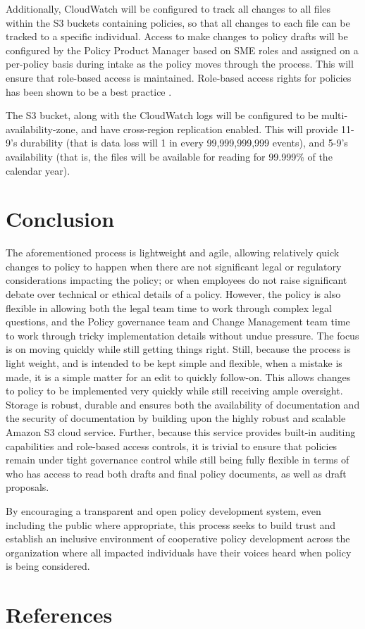 \documentclass[stu]{apa7}
\begin{document}
Additionally, CloudWatch will be configured to track all changes to all files within the S3 buckets containing policies, so that all changes to each file can be tracked to a specific individual. Access to make changes to policy drafts will be configured by the Policy Product Manager based on SME roles and assigned on a per-policy basis during intake as the policy moves through the process. This will ensure that role-based access is maintained. Role-based access rights for policies has been shown to be a best practice \citep{dasilvaSelfAdaptiveRoleBasedAccess2017}.

The S3 bucket, along with the CloudWatch logs will be configured to be multi-availability-zone, and have cross-region replication enabled. This will provide 11-9's durability (that is data loss will 1 in every 99,999,999,999 events), and 5-9's availability (that is, the files will be available for reading for 99.999\% of the calendar year).

\section{Conclusion}
\label{sec:orgd45115e}

The aforementioned process is lightweight and agile, allowing relatively quick changes to policy to happen when there are not significant legal or regulatory considerations impacting the policy; or when employees do not raise significant debate over technical or ethical details of a policy. However, the policy is also flexible in allowing both the legal team time to work through complex legal questions, and the Policy governance team and Change Management team time to work through tricky implementation details without undue pressure. The focus is on moving quickly while still getting things right. Still, because the process is light weight, and is intended to be kept simple and flexible, when a mistake is made, it is a simple matter for an edit to quickly follow-on. This allows changes to policy to be implemented very quickly while still receiving ample oversight. Storage is robust, durable and ensures both the availability of documentation and the security of documentation by building upon the highly robust and scalable Amazon S3 cloud service. Further, because this service provides built-in auditing capabilities and role-based access controls, it is trivial to ensure that policies remain under tight governance control while still being fully flexible in terms of who has access to read both drafts and final policy documents, as well as draft proposals.

By encouraging a transparent and open policy development system, even including the public where appropriate, this process seeks to build trust and establish an inclusive environment of cooperative policy development across the organization where all impacted individuals have their voices heard when policy is being considered.


\newpage
\section*{References}
\label{sec:org423ce72}
\printbibliography[heading=none]
\end{document}
